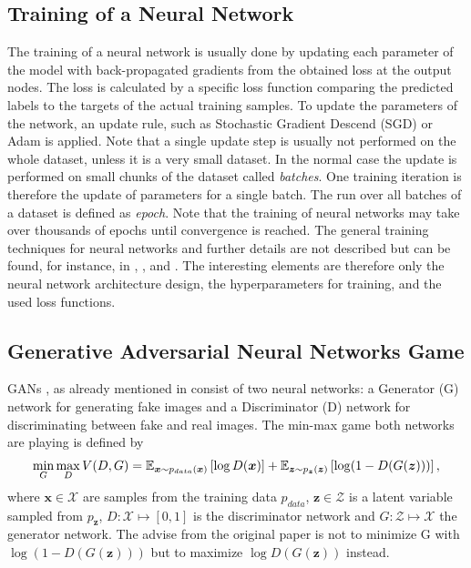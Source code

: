 
\subsection{Training of a Neural Network}
The training of a neural network is usually done by updating each parameter of the model with back-propagated gradients from the obtained loss at the output nodes.
The loss is calculated by a specific loss function comparing the predicted labels to the targets of the actual training samples.
To update the parameters of the network, an update rule, such as Stochastic Gradient Descend (SGD) or Adam \cite{Kingma2015} is applied.
Note that a single update step is usually not performed on the whole dataset, unless it is a very small dataset. 
In the normal case the update is performed on small chunks of the dataset called \emph{batches}.
One training iteration is therefore the update of parameters for a single batch.
The run over all batches of a dataset is defined as \emph{epoch}.
Note that the training of neural networks may take over thousands of epochs until convergence is reached.
The general training techniques for neural networks and further details are not described but can be found, for instance, in \cite{LeCun2006}, \cite{Goodfellow2016}, and \cite{DeepLearning}.
The interesting elements are therefore only the neural network architecture design, the hyperparameters for training, and the used loss functions.



\subsection{Generative Adversarial Neural Networks Game}\label{sec:nn_theory_gan}
GANs \cite{Goodfellow2014}, as already mentioned in  consist of two neural networks: a Generator (G) network for generating fake images and a Discriminator (D) network for discriminating between fake and real images.
The min-max game both networks are playing is defined by
\begin{equation}\label{eq:nn_theory_gan}
  \underset{G}{\min} \, \underset{D}{\max} \, V(D, G) = \mathbb{E}_{\bm{x} \sim p_{data}(\bm{x})}\left[ \log D(\bm{x}) \right] + 
    \mathbb{E}_{\bm{z} \sim p_{\bm{z}}(\bm{z})}\left[ \log (1 - D(G(\bm{z}))) \right],
\end{equation}
where $\bm{x} \in \mathcal{X}$ are samples from the training data $p_{data}$, $\bm{z} \in \mathcal{Z}$ is a latent variable sampled from $p_{\bm{z}}$, $D: \mathcal{X} \mapsto [0, 1]$ is the discriminator network and $G: \mathcal{Z} \mapsto \mathcal{X}$ the generator network.
The advise from the original paper is not to minimize G with $\log (1 - D(G(\bm{z})))$ but to maximize $\log D(G(\bm{z}))$ instead.